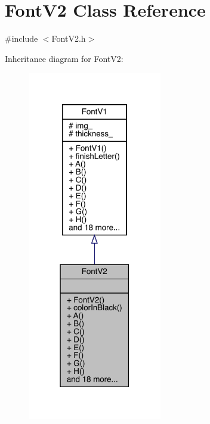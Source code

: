 \hypertarget{class_font_v2}{}\section{Font\+V2 Class Reference}
\label{class_font_v2}


{\ttfamily \#include $<$Font\+V2.\+h$>$}



Inheritance diagram for Font\+V2\+:
\nopagebreak
\begin{figure}[H]
\begin{center}
\leavevmode
\includegraphics[width=166pt]{class_font_v2__inherit__graph}
\end{center}
\end{figure}


